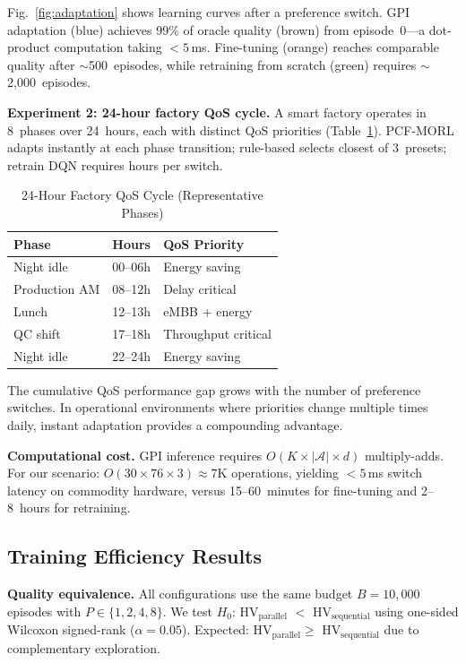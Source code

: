 \documentclass[conference]{IEEEtran}
\begin{document}
Fig.~\ref{fig:adaptation} shows learning curves after a preference switch.
GPI adaptation (blue) achieves 99\% of oracle quality (brown) from episode~0---a dot-product computation taking ${<}5$\,ms.
Fine-tuning (orange) reaches comparable quality after $\sim$500~episodes, while retraining from scratch (green) requires $\sim$2{,}000~episodes.

\textbf{Experiment 2: 24-hour factory QoS cycle.}
A smart factory operates in 8~phases over 24~hours, each with distinct QoS priorities (Table~\ref{tab:24h}).
PCF-MORL adapts instantly at each phase transition; rule-based selects closest of 3~presets; retrain DQN requires hours per switch.

\begin{table}[t]
\centering
\caption{24-Hour Factory QoS Cycle (Representative Phases)}
\label{tab:24h}
\small
\begin{tabular}{@{}lll@{}}
\toprule
\textbf{Phase} & \textbf{Hours} & \textbf{QoS Priority} \\
\midrule
Night idle & 00--06h & Energy saving \\
Production AM & 08--12h & Delay critical \\
Lunch & 12--13h & eMBB + energy \\
QC shift & 17--18h & Throughput critical \\
Night idle & 22--24h & Energy saving \\
\bottomrule
\end{tabular}
\end{table}

The cumulative QoS performance gap grows with the number of preference switches.
In operational environments where priorities change multiple times daily, instant adaptation provides a compounding advantage.

\textbf{Computational cost.}
GPI inference requires $O(K \times |\mathcal{A}| \times d)$ multiply-adds.
For our scenario: $O(30 \times 76 \times 3) \approx 7$K operations, yielding ${<}5$\,ms switch latency on commodity hardware, versus 15--60~minutes for fine-tuning and 2--8~hours for retraining.

\subsection{Training Efficiency Results}\label{sec:eval_parallel}

\textbf{Quality equivalence.}
All configurations use the same budget $B{=}10{,}000$ episodes with $P \in \{1, 2, 4, 8\}$.
We test $H_0$: HV$_\text{parallel}$ $<$ HV$_\text{sequential}$ using one-sided Wilcoxon signed-rank ($\alpha{=}0.05$).
Expected: HV$_\text{parallel} \geq$ HV$_\text{sequential}$ due to complementary exploration.
\end{document}
